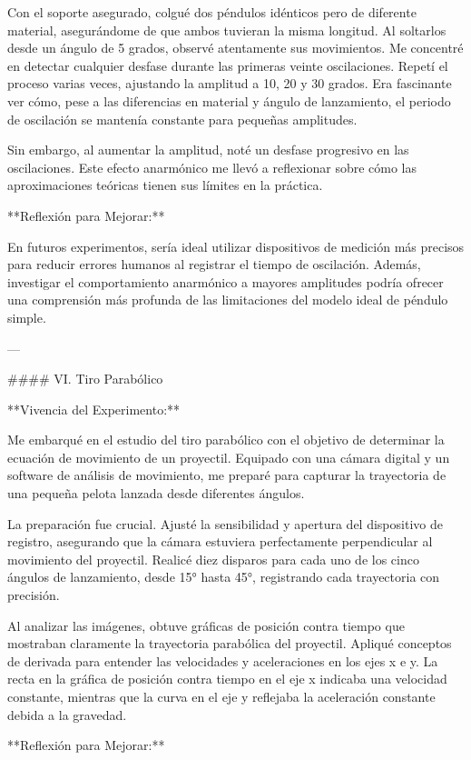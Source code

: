 \documentclass[journal]{IEEEtran}
\begin{document}
Con el soporte asegurado, colgué dos péndulos idénticos pero de diferente material, asegurándome de que ambos tuvieran la misma longitud. Al soltarlos desde un ángulo de 5 grados, observé atentamente sus movimientos. Me concentré en detectar cualquier desfase durante las primeras veinte oscilaciones. Repetí el proceso varias veces, ajustando la amplitud a 10, 20 y 30 grados. Era fascinante ver cómo, pese a las diferencias en material y ángulo de lanzamiento, el periodo de oscilación se mantenía constante para pequeñas amplitudes.

Sin embargo, al aumentar la amplitud, noté un desfase progresivo en las oscilaciones. Este efecto anarmónico me llevó a reflexionar sobre cómo las aproximaciones teóricas tienen sus límites en la práctica.

**Reflexión para Mejorar:**

En futuros experimentos, sería ideal utilizar dispositivos de medición más precisos para reducir errores humanos al registrar el tiempo de oscilación. Además, investigar el comportamiento anarmónico a mayores amplitudes podría ofrecer una comprensión más profunda de las limitaciones del modelo ideal de péndulo simple.

---

#### VI. Tiro Parabólico

**Vivencia del Experimento:**

Me embarqué en el estudio del tiro parabólico con el objetivo de determinar la ecuación de movimiento de un proyectil. Equipado con una cámara digital y un software de análisis de movimiento, me preparé para capturar la trayectoria de una pequeña pelota lanzada desde diferentes ángulos.

La preparación fue crucial. Ajusté la sensibilidad y apertura del dispositivo de registro, asegurando que la cámara estuviera perfectamente perpendicular al movimiento del proyectil. Realicé diez disparos para cada uno de los cinco ángulos de lanzamiento, desde 15° hasta 45°, registrando cada trayectoria con precisión.

Al analizar las imágenes, obtuve gráficas de posición contra tiempo que mostraban claramente la trayectoria parabólica del proyectil. Apliqué conceptos de derivada para entender las velocidades y aceleraciones en los ejes x e y. La recta en la gráfica de posición contra tiempo en el eje x indicaba una velocidad constante, mientras que la curva en el eje y reflejaba la aceleración constante debida a la gravedad.

**Reflexión para Mejorar:**
\end{document}
